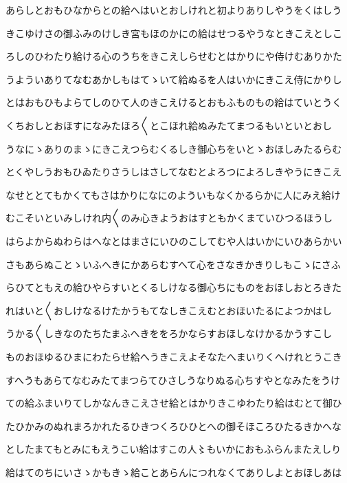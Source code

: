 \documentclass[a4paper,11pt,landscape]{ltjtarticle}
\begin{document}
\par\medskip
あらしとおもひなからとの給へはいとおしけれと初よりありしやうをくはしう
\par\medskip
きこゆけさの御ふみのけしき宮もほのかにの給はせつるやうなときこえとしこ
\par\medskip
ろしのひわたり給ける心のうちをきこえしらせむとはかりにや侍けむありかた
\par\medskip
うよういありてなむあかしもはてゝいて給ぬるを人はいかにきこえ侍にかりし
\par\medskip
とはおもひもよらてしのひて人のきこえけるとおもふものもの給はていとうく
\par\medskip
くちおしとおほすになみたほろ〱とこほれ給ぬみたてまつるもいといとおし
\par\medskip
うなにゝありのまゝにきこえつらむくるしき御心ちをいとゝおほしみたるらむ
\par\medskip
とくやしうおもひゐたりさうしはさしてなむとよろつによろしきやうにきこえ
\par\medskip
なせととてもかくてもさはかりになにのよういもなくかるらかに人にみえ給け
\par\medskip
むこそいといみしけれ内〱のみ心きようおはすともかくまていひつるほうし
\par\medskip
はらよからぬわらはへなとはまさにいひのこしてむや人はいかにいひあらかい
\par\medskip
さもあらぬことゝいふへきにかあらむすへて心をさなきかきりしもこゝにさふ
\par\medskip
らひてともえの給ひやらすいとくるしけなる御心ちにものをおほしおとろきた
\par\medskip
れはいと〱おしけなるけたかうもてなしきこえむとおほいたるによつかはし
\par\medskip
うかる〱しきなのたちたまふへきををろかならすおほしなけかるかうすこし
\par\medskip
ものおほゆるひまにわたらせ給へうきこえよそなたへまいりくへけれとうこき
\par\medskip
すへうもあらてなむみたてまつらてひさしうなりぬる心ちすやとなみたをうけ
\par\medskip
ての給ふまいりてしかなんきこえさせ給とはかりきこゆわたり給はむとて御ひ
\par\medskip
たひかみのぬれまろかれたるひきつくろひひとへの御そほころひたるきかへな
\par\medskip
としたまてもとみにもえうこい給はすこの人〻もいかにおもふらんまたえしり
\par\medskip
給はてのちにいさゝかもきゝ給ことあらんにつれなくてありしよとおほしあは
\par\medskip
\end{document}
